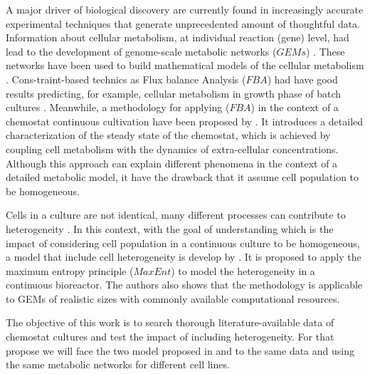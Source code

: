 \documentclass[]{article}
\begin{document}
	A major driver of biological discovery are currently found in increasingly accurate experimental 
	techniques that generate unprecedented amount of thoughtful data. 
	Information about cellular metabolism, at individual reaction (gene) level, had lead to the development 
	of genome-scale metabolic networks ($GEMs$) \cite{kanehisaDataInformationKnowledge2014,
		caspiMetaCycDatabaseMetabolic2016}. 
	These networks have been used to build mathematical models of the cellular metabolism 
	\cite{palssonSystemBiologyPropereties2006}.
	Cons-traint-based technics as Flux balance Analysis ($FBA$) had have good results predicting, for example, 
	cellular metabolism in growth phase of batch cultures \cite{palssonSystemBiologyPropereties2006}. 
	Meanwhile, a methodology for applying ($FBA$) in the context of a chemostat continuous cultivation have 
	been proposed by \cite{fernandez-de-cossio-diazCharacterizingSteadyStates2017}. 
	It introduces a detailed characterization of the steady state of the chemostat, which is achieved by 
	coupling cell metabolism with the dynamics of extra-cellular concentrations. 
	Although this approach can explain different phenomena in the context of a detailed metabolic model, 
	it have the drawback that it assume cell population to be homogeneous.
	
	Cells in a culture are not identical, many different processes can contribute to heterogeneity 
	\cite{kivietStochasticityMetabolismGrowth2014, elowitzStochasticGeneExpression2002, 
		fernandez-de-cossio-diazCellPopulationHeterogeneity2019, 
		huhRandomPartitioningMolecules2011, wangClonalEvolutionGlioblastoma2016}. 
	In this context, with the goal of understanding which is the impact of considering cell population in a 
	continuous culture to be homogeneous, a model that include cell heterogeneity is develop by 
	\cite{fernandez-de-cossio-diazCellPopulationHeterogeneity2019}. 
	It is proposed to apply the maximum entropy principle ($MaxEnt$) 
	\cite{jaynesInformationTheoryStatistical1957, jaynesProbabilityTheoryLogic2003, cAnalysisCHOCells2001,
		harteMaximumInformationEntropy2014, schneidmanWeakPairwiseCorrelations2006, 
		demartinoStatisticalMechanicsMetabolic2018, demartinoGrowthEntropyBacterial2016, 
		demartinoQuantifyingEntropicCost2017}
	to model the heterogeneity in a continuous bioreactor. 
	The authors also shows that the methodology is applicable to GEMs of realistic sizes with commonly 
	available computational resources. 
	
	The objective of this work is to search thorough literature-available data of chemostat cultures 
	and test the impact of including heterogeneity.
	For that propose we will face the two model proposed in \cite{fernandez-de-cossio-diazCharacterizingSteadyStates2017} 
	and \cite{fernandez-de-cossio-diazCellPopulationHeterogeneity2019} to the same data and using the same 
	metabolic networks for different cell lines.
	
\end{document}
